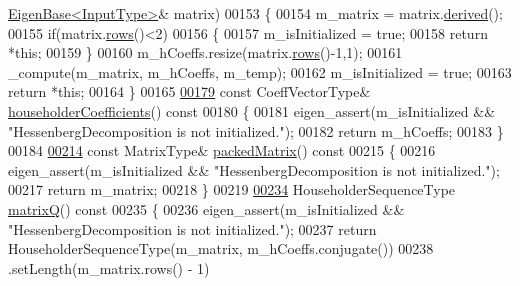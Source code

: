 \begin{DoxyCode}
      \hyperlink{group___core___module_struct_eigen_1_1_eigen_base}{EigenBase<InputType>}& matrix)
00153     \{
00154       m\_matrix = matrix.\hyperlink{group___core___module_a324b16961a11d2ecfd2d1b7dd7946545}{derived}();
00155       \textcolor{keywordflow}{if}(matrix.\hyperlink{group___core___module_a8141320ba8df384426c298b32b000d8e}{rows}()<2)
00156       \{
00157         m\_isInitialized = \textcolor{keyword}{true};
00158         \textcolor{keywordflow}{return} *\textcolor{keyword}{this};
00159       \}
00160       m\_hCoeffs.resize(matrix.\hyperlink{group___core___module_a8141320ba8df384426c298b32b000d8e}{rows}()-1,1);
00161       \_compute(m\_matrix, m\_hCoeffs, m\_temp);
00162       m\_isInitialized = \textcolor{keyword}{true};
00163       \textcolor{keywordflow}{return} *\textcolor{keyword}{this};
00164     \}
00165 
\hyperlink{group___eigenvalues___module_a65fa81ce79d956baa59a30a6d82f8a84}{00179}     \textcolor{keyword}{const} CoeffVectorType& \hyperlink{group___eigenvalues___module_a65fa81ce79d956baa59a30a6d82f8a84}{householderCoefficients}()\textcolor{keyword}{ const}
00180 \textcolor{keyword}{    }\{
00181       eigen\_assert(m\_isInitialized && \textcolor{stringliteral}{"HessenbergDecomposition is not initialized."});
00182       \textcolor{keywordflow}{return} m\_hCoeffs;
00183     \}
00184 
\hyperlink{group___eigenvalues___module_a1f72b7612fd4edc5a6f31005e433e1dd}{00214}     \textcolor{keyword}{const} MatrixType& \hyperlink{group___eigenvalues___module_a1f72b7612fd4edc5a6f31005e433e1dd}{packedMatrix}()\textcolor{keyword}{ const}
00215 \textcolor{keyword}{    }\{
00216       eigen\_assert(m\_isInitialized && \textcolor{stringliteral}{"HessenbergDecomposition is not initialized."});
00217       \textcolor{keywordflow}{return} m\_matrix;
00218     \}
00219 
\hyperlink{group___eigenvalues___module_a346441e4902a58d43d698ac3da6ff791}{00234}     HouseholderSequenceType \hyperlink{group___eigenvalues___module_a346441e4902a58d43d698ac3da6ff791}{matrixQ}()\textcolor{keyword}{ const}
00235 \textcolor{keyword}{    }\{
00236       eigen\_assert(m\_isInitialized && \textcolor{stringliteral}{"HessenbergDecomposition is not initialized."});
00237       \textcolor{keywordflow}{return} HouseholderSequenceType(m\_matrix, m\_hCoeffs.conjugate())
00238              .setLength(m\_matrix.rows() - 1)

\end{DoxyCode}
